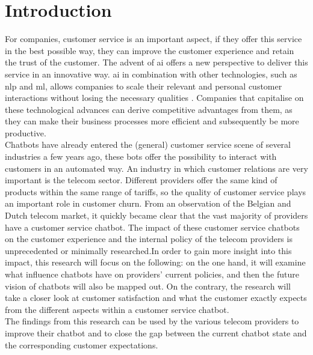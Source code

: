 \mainmatter
\pagestyle{headings}

\chapter{Introduction}
\label{ch:introduction}
For companies, customer service is an important aspect, if they offer this service in the best possible way, they can improve the customer experience and retain the trust of the customer. 
The advent of \acrfull{ai} offers a new perspective to deliver this service in an innovative way. \acrshort{ai} in combination with other technologies, such as \acrshort{nlp} and \acrshort{ml}, allows companies to scale their relevant and personal customer interactions without losing the necessary qualities \citep*{Quintino2019, Wilson2017}. Companies that capitalise on these technological advances can derive competitive advantages from them, as they can make their business processes more efficient and subsequently be more productive.\\
\break
Chatbots have already entered the (general) customer service scene of several industries a few years ago, these bots offer the possibility to interact with customers in an automated way. An industry in which customer relations are very important is the telecom sector. Different providers offer the same kind of products within the same range of tariffs, so the quality of customer service plays an important role in customer churn. From an observation of the Belgian and Dutch telecom market, it quickly became clear that the vast majority of providers have a customer service chatbot. The impact of these customer service chatbots on the customer experience and the internal policy of the telecom providers is unprecedented or minimally researched.In order to gain more insight into this impact, this research will focus on the following: on the one hand, it will examine what influence chatbots have on providers' current policies, and then the future vision of chatbots will also be mapped out. On the contrary, the research will take a closer look at customer satisfaction and what the customer exactly expects from the different aspects within a customer service chatbot.\\
\break
The findings from this research can be used by the various telecom providers to improve their chatbot and to close the gap between the current chatbot state and the corresponding customer expectations.